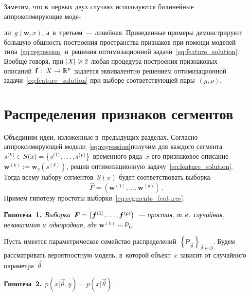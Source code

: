 \begin{multicols}{2}
Заметим, что в~первых двух случаях используются билинейные аппроксимирующие 
моде-\linebreak\vspace*{-12pt}

\columnbreak

\noindent
ли~$g(\mathbf{w},x)$, а~в~третьем~--- линейная.
Приведенные примеры демонстрируют большую общность построения пространства 
признаков при помощи моделей типа~\eqref{eq:regression} и~решения оптимизационной\linebreak 
задачи~\eqref{eq:feature_solution}.
Вообще говоря, при $|X|\hm\geqslant 2$ любая процедура построения признаковых 
описаний~$\mathbf{f}:\;X\hm\to \mathbb{R}^n$ задается эквивалентно решением 
оптимизационной задачи~\eqref{eq:feature_solution} при выборе соответствующей 
пары~$(g,\rho)$.

\section{Распределения признаков сегментов}

Объединим идеи, изложенные в~предыдущих разделах.
Согласно аппроксимирующей модели~\eqref{eq:regression}\linebreak получим для 
каж\-до\-го сегмента~$s^{(k)}\hm\in S(x)\hm=\left\{s^{(1)},\ldots,s^{(p)}\right\}$ 
временн$\acute{\mbox{о}}$го ряда~$x$ его признаковое 
описание~$\mathbf{w}^{(k)}:=\mathbf{w}_g(s^{(k)})$, решив оптимизационную 
задачу~\eqref{eq:feature_solution}.
Тогда всему набору \mbox{сегментов}~$S(x)$ будет соответствовать выборка:
\begin{equation}
\label{eq:segments_features}
\vec{F}=\left(\mathbf{w}^{(1)},\dots,\mathbf{w}^{(p)}\right)\,.
\end{equation}
Примем гипотезу простоты выборки~\eqref{eq:segments_features}.

\smallskip

\noindent
\textbf{Гипотеза~1.}\
\textit{Выборка~$\vec{F}\hm=\left(\vec{f}^{(1)},\dots,\vec{f}^{(p)}\right)$~--- 
прос\-тая, т.\,е.\ случайная, независимая и~однородная, где}
 $\mathbf{w}^{(k)}\sim\mathsf{P}_0$.


\smallskip

Пусть имеется параметрическое семейство 
распределений~$\left\{\mathsf{P}_{\vec\theta}\right\}_{\vec\theta\in 
\Theta}$.
Будем рассматривать вероятностную модель, в~которой объект~$x$ 
зависит от случайного параметра~$\vec\theta$.
\smallskip

\noindent
\textbf{Гипотеза~2.}\
$p(x|\vec\theta,y)=p(x|\vec\theta)$.


\end{multicols}
